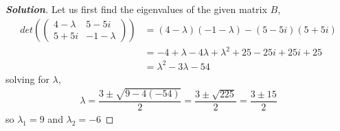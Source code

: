 \documentclass[11pt]{article}
\newenvironment{solution}{\begin{proof}[\textbf{\textit{Solution}}] }{\end{proof}}
\newcommand{\lrp}[1]{\left(#1\right)}
\begin{document}
        \begin{solution}
            Let us first find the eigenvalues of the given matrix $B$,
            \begin{align*}
                det\lrp{\begin{pmatrix}
                    4-\lambda & 5-5i \\ 
                    5 + 5i & -1 - \lambda
                \end{pmatrix} } &= (4-\lambda)(-1-\lambda) - (5-5i)(5 +5i) \\
                &= -4 + \lambda -4\lambda +\lambda^{2} + 25 -25i +25i + 25 \\
                &= \lambda^{2} - 3\lambda - 54
            \end{align*}
            solving for $\lambda$,
            \begin{align*}
                \lambda = \dfrac{3 \pm \sqrt{9 - 4(-54)}}{2} = \dfrac{3 \pm \sqrt{225}}{2} = \dfrac{3 \pm 15}{2}
            \end{align*}
            so $\lambda_1 = 9$ and $\lambda_2 = -6$


\end{solution}
\end{document}
